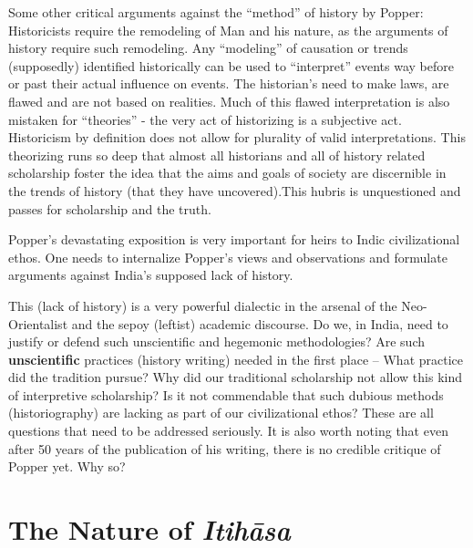 Some other critical arguments against the “method” of history by Popper: Historicists require the remodeling of Man and his nature, as the arguments of history require such remodeling. Any “modeling” of causation or trends (supposedly) identified historically can be used to “interpret” events way before or past their actual influence on events. The historian’s need to make laws, are flawed and are not based on realities. Much of this flawed interpretation is also mistaken for “theories” - the very act of historizing is a subjective act. Historicism by definition does not allow for plurality of valid interpretations. This theorizing runs so deep that almost all historians and all of history related scholarship foster the idea that the aims and goals of society are discernible in the trends of history (that they have uncovered).This hubris is unquestioned and passes for scholarship and the truth.

Popper’s devastating exposition is very important for heirs to Indic civilizational ethos. One needs to internalize Popper’s views and observations and formulate arguments against India’s supposed lack of history.

This (lack of history) is a very powerful dialectic in the arsenal of the Neo-Orientalist and the sepoy (leftist) academic discourse. Do we, in India, need to justify or defend such unscientific and hegemonic methodologies? Are such \textbf{unscientific} practices (history writing) needed in the first place – What practice did the tradition pursue? Why did our traditional scholarship not allow this kind of interpretive scholarship? Is it not commendable that such dubious methods (historiography) are lacking as part of our civilizational ethos? These are all questions that need to be addressed seriously. It is also worth noting that even after 50 years of the publication of his writing, there is no credible critique of Popper yet. Why so?


\section*{The Nature of \textit{Itihāsa}}

